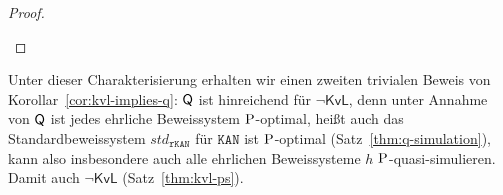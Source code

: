 \begin{proof}
\begin{prooflist}




    \end{prooflist}
\end{proof}

Unter dieser Charakterisierung erhalten wir einen zweiten trivialen Beweis von Korollar~\ref{cor:kvl-implies-q}: $\hQ$ ist hinreichend für $\neg\mathsf{KvL}$, denn unter Annahme von $\hQ$ ist jedes ehrliche Beweissystem $\P$-optimal, heißt auch das Standardbeweissystem $\mathit{std}_{\mathtt{rKAN}}$ für $\mathtt{KAN}$ ist $\P$-optimal (Satz~\ref{thm:q-simulation}), kann also insbesondere auch alle ehrlichen Beweissysteme $h$ $\P$-quasi-simulieren. Damit auch $\neg\mathsf{KvL}$ (Satz~\ref{thm:kvl-ps}).

